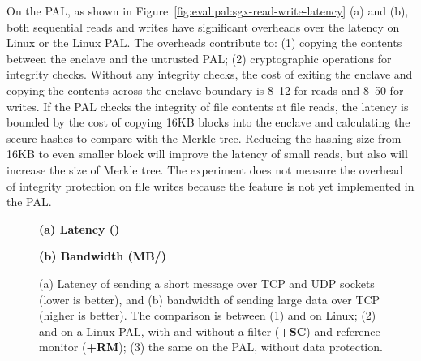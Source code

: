 On the \sgx{} PAL,
as shown in
Figure~\ref{fig:eval:pal:sgx-read-write-latency} (a) and (b), both sequential reads and writes
have significant overheads over the latency on Linux or the Linux PAL.
The overheads contribute to:
(1) copying the contents between the enclave and the untrusted PAL; (2) cryptographic operations for 
integrity checks. Without any integrity checks,
the cost of exiting the enclave
and copying the contents across the enclave boundary is
8--12 \usec{} for reads and 8--50 \usec{} for writes.
If the \sgx{} PAL checks the integrity of file contents
at file reads,
the latency is bounded by
the cost of copying 16KB blocks into the enclave
and calculating the secure hashes to compare with the Merkle tree.
Reducing the hashing size from 16KB to even smaller block
will improve
the latency of small reads,
but also will increase the size of Merkle tree.
The experiment does not measure the overhead of integrity protection on file writes
because the feature is not yet implemented
in the \sgx{} PAL.











\begin{figure*}[t!]
\centering
\footnotesize
{}
\parbox{0.24\textwidth}{\quad}
\parbox{0.49\textwidth}{\centering\bf (a) Latency ({\usec})}
\parbox{0.24\textwidth}{\centering\bf (b) Bandwidth (MB/\asec{})}
\caption{(a) Latency of sending a short message over TCP and UDP sockets (lower is better), and (b) bandwidth of sending large data over TCP (higher is better).
The comparison is between (1)  and  on Linux; (2)  and  on a Linux PAL, with and without a \seccomp{} filter ({\bf +SC}) and reference monitor ({\bf +RM}); (3) the same \hostapis{} on the \sgx{} PAL, without data protection.}
\label{fig:eval:pal:network-latency-bandwidth}
\end{figure*}



